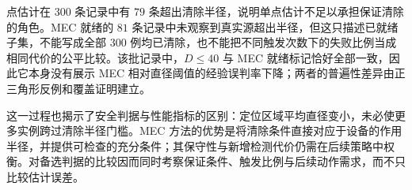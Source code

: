 点估计在 $300$ 条记录中有 $79$ 条超出清除半径，说明单点估计不足以承担保证清除的角色。MEC 就绪的 $81$ 条记录中未观察到真实源超出半径，但这只描述已就绪子集，不能写成全部 $300$ 例均已清除，也不能把不同触发次数下的失败比例当成相同代价的公平比较。该批记录中，$D\leq40$ 与 MEC 就绪标记恰好全部一致，因此它本身没有展示 MEC 相对直径阈值的经验误判率下降；两者的普遍性差异由正三角形反例和覆盖证明建立。

这一过程也揭示了安全判据与性能指标的区别：定位区域平均直径变小，未必使更多实例跨过清除半径门槛。MEC 方法的优势是将清除条件直接对应于设备的作用半径，并提供可检查的充分条件；其保守性与新增检测代价仍需在后续策略中权衡。对备选判据的比较因而同时考察保证条件、触发比例与后续动作需求，而不只比较估计误差。
